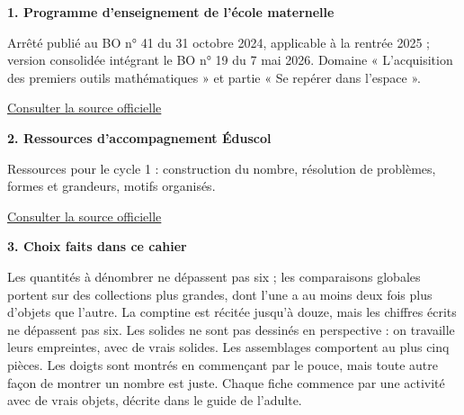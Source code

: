\clearpage\pagestyle{matSimple}\label{sources}
{\fontsize{9.5}{13.5}\selectfont \textbf{1. Programme d’enseignement de l’école maternelle}\par Arrêté publié au BO n° 41 du 31 octobre 2024, applicable à la rentrée 2025 ; version consolidée intégrant le BO n° 19 du 7 mai 2026. Domaine « L’acquisition des premiers outils mathématiques » et partie « Se repérer dans l’espace ».\par\href{https://eduscol.education.gouv.fr/sites/default/files/document/programme-cycle-1-consolide-127565.pdf}{\textcolor{otGreenDark}{Consulter la source officielle}}\par\medskip
\textbf{2. Ressources d’accompagnement Éduscol}\par Ressources pour le cycle 1 : construction du nombre, résolution de problèmes, formes et grandeurs, motifs organisés.\par\href{https://eduscol.education.gouv.fr/}{\textcolor{otGreenDark}{Consulter la source officielle}}\par\medskip
\textbf{3. Choix faits dans ce cahier}\par Les quantités à dénombrer ne dépassent pas six ; les comparaisons globales portent sur des collections plus grandes, dont l’une a au moins deux fois plus d’objets que l’autre. La comptine est récitée jusqu’à douze, mais les chiffres écrits ne dépassent pas six. Les solides ne sont pas dessinés en perspective : on travaille leurs empreintes, avec de vrais solides. Les assemblages comportent au plus cinq pièces. Les doigts sont montrés en commençant par le pouce, mais toute autre façon de montrer un nombre est juste. Chaque fiche commence par une activité avec de vrais objets, décrite dans le guide de l’adulte.\par}
